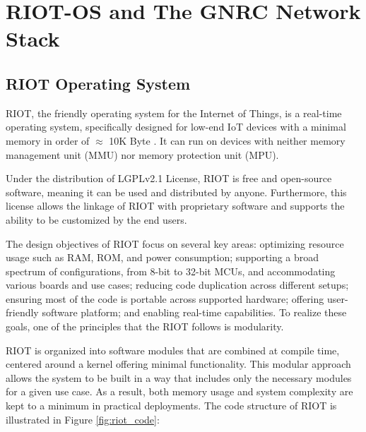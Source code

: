 \chapter{RIOT-OS and The GNRC Network Stack}
\section{RIOT Operating System}
  RIOT, the friendly operating system for the Internet of Things, is a real-time operating system,
  specifically designed for low-end IoT devices with a minimal memory in order of $\approx$ 10K Byte
  \cite{riot}. It can run on devices with neither memory management unit (MMU) nor memory protection unit (MPU).

  Under the distribution of LGPLv2.1 License, RIOT is free and open-source software, meaning it can
  be used and distributed by anyone. Furthermore, this license allows the linkage of RIOT with
  proprietary software and supports the ability to be customized by the end users.

  The design objectives of RIOT focus on several key areas: optimizing resource usage such as RAM, 
  ROM, and power consumption; supporting a broad spectrum of configurations, from 8-bit to 32-bit MCUs, 
  and accommodating various boards and use cases; reducing code duplication across different setups; 
  ensuring most of the code is portable across supported hardware; offering user-friendly software 
  platform; and enabling real-time capabilities. To realize these goals, one of the principles that
  the RIOT follows is modularity. 

  RIOT is organized into software modules that are combined at compile time, centered around a kernel 
  offering minimal functionality. This modular approach allows the system to be built in a way that includes 
  only the necessary modules for a given use case. As a result, both memory usage and system complexity 
  are kept to a minimum in practical deployments. The code structure of RIOT is illustrated in
  Figure \ref{fig:riot_code}:
  
